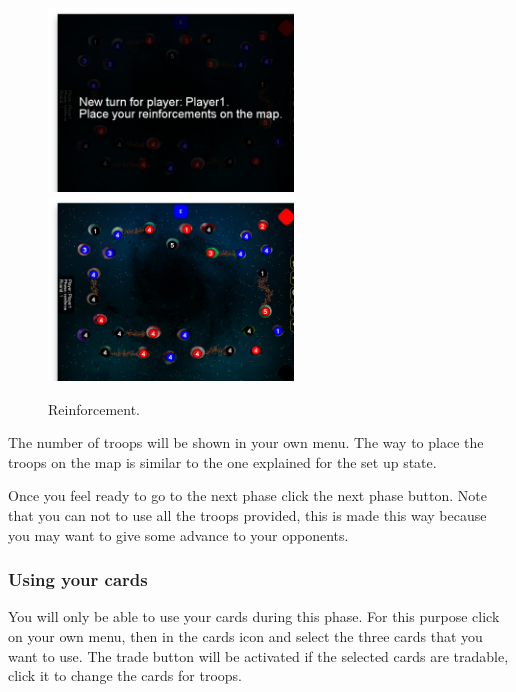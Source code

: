 \documentclass[12pt,a4paper]{article}
\begin{document}
\begin{figure}[h!]
\centering
\includegraphics[width=6.5cm]{pic/screenshot03.png}
\includegraphics[width=6.5cm]{pic/screenshot04.png}
\caption{Reinforcement.}
\label{fig:reinf}
\end{figure}

The number of troops will be shown in your own menu. The way to place the troops on the map is similar to the one explained for the set up state.

Once you feel ready to go to the next phase click the next phase button. Note that you can not to use all the troops provided, this is made this way because you may want to give some advance to your opponents.

\subsubsection{Using your cards}
You will only be able to use your cards during this phase. For this purpose click on your own menu, then in the cards icon and select the three cards that you want to use. The trade button will be activated if the selected cards are tradable, click it to change the cards for troops.
\end{document}
